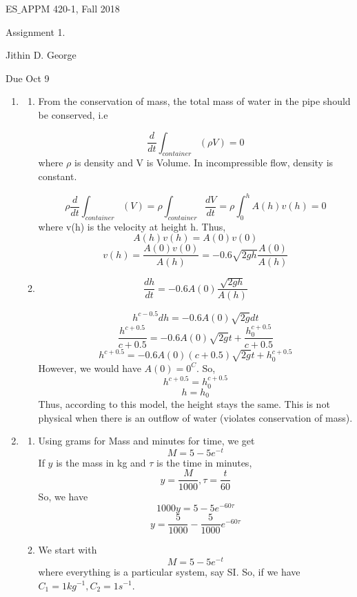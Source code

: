 \documentclass[letterpaper,12pt]{article}
\begin{document}




\noindent
{\scriptsize ES$\_$APPM 420-1, Fall 2018} \hfill

\begin{center}
\large
Assignment 1.
\normalsize

Jithin D. George
\end{center}

\noindent
Due Oct 9
\vspace{.3in}




\noindent


\begin{enumerate}
\item
\begin{enumerate}
\item
From the conservation of mass, the total mass of water in the pipe should be conserved, i.e

\[\frac{d}{dt}\int_{container} (\rho V)=0\]
where $\rho$ is density and V is Volume. In incompressible flow, density is constant.

\[\rho \frac{d}{dt}\int_{container} ( V)=\rho \int_{container} \frac{dV}{dt} = \rho \int_{0}^h A(h ) v(h) =0\]
where v(h) is the velocity at height h.
Thus,
\[A(h)v(h)=A(0)v(0)\]
\[v(h)=\frac{A(0)v(0)}{A(h)} = - 0.6 \sqrt{2gh}\frac{A(0)}{A(h)}\]
\item
 \[\frac{dh}{dt}= -0.6 A(0)\frac{\sqrt{2gh}}{A(h)}\]

  \[h^{c-0.5} dh = -0.6 A(0)\sqrt{2g} dt\]
	  \[\frac{h^{c+0.5}}{c+0.5}  = -0.6 A(0)\sqrt{2g} t+\frac{h_0^{c+0.5}}{c+0.5}\]
			  \[h^{c+0.5}  = -0.6 A(0)(c+0.5)\sqrt{2g} t+h_0^{c+0.5}\]
However, we would have $A(0)= 0^C$. So,
 \[h^{c+0.5}  = h_0^{c+0.5}\]
  \[h  = h_0\]
	Thus, according to this model, the height stays the same. This is not physical when there is an outflow of water (violates conservation of mass).
\end{enumerate}

\item
\begin{enumerate}
\item
Using grams for Mass and minutes for time, we get
\[ M = 5 -5 e^{-t}\]
If $y$ is the mass in kg and $\tau$ is the time in minutes,
\[ y = \frac{M}{1000}, \tau = \frac{t}{60}\]
So, we have
\[ 1000 y = 5 -5 e^{-60\tau }\]
\[ y = \frac{5}{1000} -\frac{5}{1000} e^{-60\tau }\]
\item
We start with
\[ M = 5 -5 e^{-t}\]
where everything is a particular system, say SI. So, if we have $C_1 = 1 kg^{-1}, C_2 = 1 s^{-1}$.


\end{enumerate}
\end{enumerate}
\end{document}
